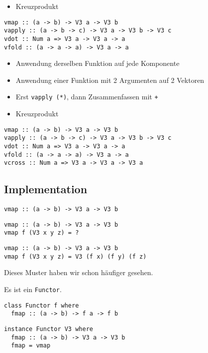 \documentclass{beamer}
\begin{document}
\begin{frame}[fragile]
\begin{overprint}
\begin{itemize}
 \item Kreuzprodukt
\end{itemize}
\begin{verbatim}
vmap :: (a -> b) -> V3 a -> V3 b
vapply :: (a -> b -> c) -> V3 a -> V3 b -> V3 c
vdot :: Num a => V3 a -> V3 a -> a
vfold :: (a -> a -> a) -> V3 a -> a
\end{verbatim}
\begin{itemize}
 \item Anwendung derselben Funktion auf jede Komponente
 \item Anwendung einer Funktion mit 2 Argumenten auf 2 Vektoren
 \item Erst \texttt{vapply (*)}, dann Zusammenfassen mit \texttt{+}
 \item Kreuzprodukt
\end{itemize}
\begin{verbatim}
vmap :: (a -> b) -> V3 a -> V3 b
vapply :: (a -> b -> c) -> V3 a -> V3 b -> V3 c
vdot :: Num a => V3 a -> V3 a -> a
vfold :: (a -> a -> a) -> V3 a -> a
vcross :: Num a => V3 a -> V3 a -> V3 a
\end{verbatim}
\end{overprint}
\end{frame}

\subsection{Implementation}

\begin{frame}[fragile]
\begin{overprint}
\begin{verbatim}
vmap :: (a -> b) -> V3 a -> V3 b
\end{verbatim}
\begin{verbatim}
vmap :: (a -> b) -> V3 a -> V3 b
vmap f (V3 x y z) = ?
\end{verbatim}
\begin{verbatim}
vmap :: (a -> b) -> V3 a -> V3 b
vmap f (V3 x y z) = V3 (f x) (f y) (f z)
\end{verbatim}
\end{overprint}
\pause
\pause
\pause
Dieses Muster haben wir schon häufiger gesehen.\\\par
\pause
Es ist ein \texttt{Functor}.
\begin{verbatim}
class Functor f where
  fmap :: (a -> b) -> f a -> f b
\end{verbatim}
\pause
\begin{verbatim}
instance Functor V3 where
  fmap :: (a -> b) -> V3 a -> V3 b
  fmap = vmap
\end{verbatim}

\end{frame}
\end{document}
